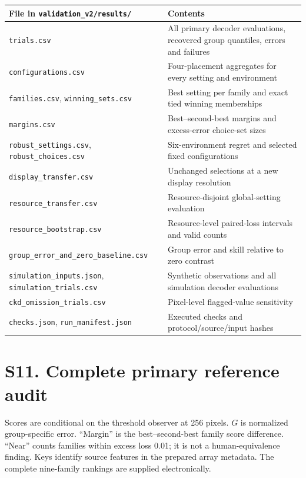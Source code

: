 \documentclass[10pt]{article}
\begin{document}
\begin{longtable}{p{5.5cm}p{10cm}}\toprule
File in \texttt{validation\_v2/results/} & Contents\\\midrule\endhead
\texttt{trials.csv} & All primary decoder evaluations, recovered group quantiles, errors and failures\\
\texttt{configurations.csv} & Four-placement aggregates for every setting and environment\\
\texttt{families.csv}, \texttt{winning\_sets.csv} & Best setting per family and exact tied winning memberships\\
\texttt{margins.csv} & Best--second-best margins and excess-error choice-set sizes\\
\texttt{robust\_settings.csv}, \texttt{robust\_choices.csv} & Six-environment regret and selected fixed configurations\\
\texttt{display\_transfer.csv} & Unchanged selections at a new display resolution\\
\texttt{resource\_transfer.csv} & Resource-disjoint global-setting evaluation\\
\texttt{resource\_bootstrap.csv} & Resource-level paired-loss intervals and valid counts\\
\texttt{group\_error\_and\_}\allowbreak\texttt{zero\_baseline.csv} & Group error and skill relative to zero contrast\\
\texttt{simulation\_inputs.json}, \texttt{simulation\_trials.csv} & Synthetic observations and all simulation decoder evaluations\\
\texttt{ckd\_omission\_trials.csv} & Pixel-level flagged-value sensitivity\\
\texttt{checks.json}, \texttt{run\_manifest.json} & Executed checks and protocol/source/input hashes\\\bottomrule
\end{longtable}

\section*{S11. Complete primary reference audit}
Scores are conditional on the threshold observer at 256 pixels. $G$ is normalized group-specific error. ``Margin'' is the best--second-best family score difference. ``Near'' counts families within excess loss 0.01; it is not a human-equivalence finding. Keys identify source features in the prepared array metadata. The complete nine-family rankings are supplied electronically.
\small\normalsize
\end{document}
